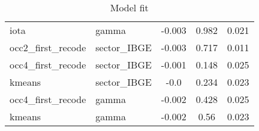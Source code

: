 \begin{table}[h!] \centering 
\caption{Model fit}
\begin{tabular}{llccc}
\toprule
iota	& gamma	& -0.003	& 0.982	& 0.021	 \\ 
occ2\_first\_recode	& sector\_IBGE	& -0.003	& 0.717	& 0.011	 \\ 
occ4\_first\_recode	& sector\_IBGE	& -0.001	& 0.148	& 0.025	 \\ 
kmeans	& sector\_IBGE	& -0.0	& 0.234	& 0.023	 \\ 
occ4\_first\_recode	& gamma	& -0.002	& 0.428	& 0.025	 \\ 
kmeans	& gamma	& -0.002	& 0.56	& 0.023	 \\ 
\bottomrule  
\end{tabular} 
\label{table:model_fit} 
\end{table} 
